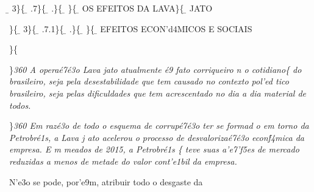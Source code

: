 \b{} 3\}\{\rtlch{} \ab{}
\ltrch{} \b{} .7\}\{\rtlch{}
\ab{} \ltrch{} \b{} .\}\{\rtlch{}
\ab{} \ltrch{} \b{}
\}\{\rtlch{} \ab{} \ltrch{} \b{} OS
EFEITOS DA LAVA\}\{\rtlch{} \ab{} \ltrch{}
\b{} JATO \par \}\{\rtlch{}
\ab{} \ltrch{} \b{}
3\}\{\rtlch{} \ab{} \ltrch{}
\b{} .7.1\}\{\rtlch{}
\ab{} \ltrch{} \b{} .\}\{\rtlch{}
\ab{} \ltrch{} \b{}
\}\{\rtlch{} \ab{} \ltrch{}
\b{} EFEITOS ECON'd4MICOS E SOCIAIS
\par \}\{\rtlch{}  \ltrch{} 
\par \}\pard \ltrpar\qj {}\sl360\widctlpar\wrapdefault\faauto{} {\rtlch{}  \ltrch{}  A opera\'e7\'e3o Lava}{\rtlch{}  \ltrch{}  jato atualmente 
\'e9 fato corriqueiro n}{\rtlch{}  \ltrch{}  o cotidiano}\{\rtlch{}
 \ltrch{}  do brasileiro, seja
pela desestabilidade que tem causado no contexto pol'ed tico brasileiro,
seja pelas dificuldades que tem acrescentado no dia a dia material de
todos.
\par \}\pard \ltrpar\qj {}\sl360\widctlpar\wrapdefault\faauto{} {\rtlch{}  \ltrch{}  \tab Em raz\'e3o de todo o esquema de corrup\'e7\'e3o ter se formad}{\rtlch{}  
\ltrch{}  o em torno da Petrobr\'e1s, a Lava}{\rtlch{}  \ltrch{}  j}{\rtlch{}  \ltrch{}  ato acelerou o processo de desvaloriza\'e7\'e3o econ\'f4mica da empresa. }{
\rtlch{}  \ltrch{}  E}{\rtlch{}  \ltrch{}  m meados de 2015, }{\rtlch{}  \ltrch{}  a Petrobr\'e1s }\{\rtlch{}
 \ltrch{}  teve suas a'e7'f5es de
mercado reduzidas a menos de metade do valor cont'e1bil da empresa.
\par \tab N'e3o se pode, por'e9m, atribuir todo o desgaste da
